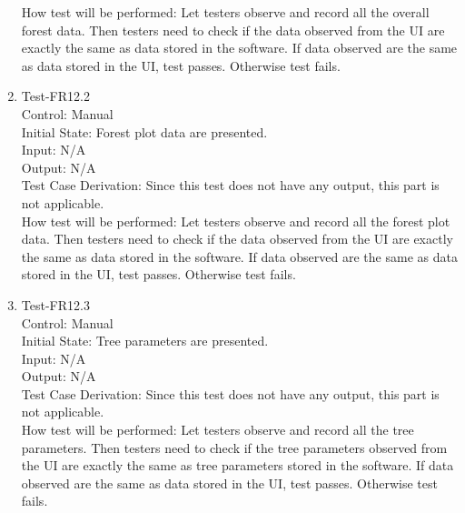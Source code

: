 \documentclass[12pt, titlepage]{article}
\begin{document}
\begin{enumerate}
How test will be performed: Let testers observe and record all the overall 
forest data. Then testers need to check if the data observed from the UI 
are exactly the same as data stored in the software. If data observed are the same
as data stored in the UI, test passes. Otherwise test fails.

\item{Test-FR12.2\\}
Control: Manual\\ 

Initial State: Forest plot data are presented.\\

Input: N/A\\

Output: N/A\\

Test Case Derivation: Since this test does not have any output, this part is
not applicable.\\
					
How test will be performed: Let testers observe and record all the forest plot
data. Then testers need to check if the data observed from the UI 
are exactly the same as data stored in the software. If data observed are the same
as data stored in the UI, test passes. Otherwise test fails.

\item{Test-FR12.3\\}
Control: Manual\\ 

Initial State: Tree parameters are presented.\\

Input: N/A\\

Output: N/A\\

Test Case Derivation: Since this test does not have any output, this part is
not applicable.\\
					
How test will be performed: Let testers observe and record all the tree
parameters. Then testers need to check if the tree parameters observed from the UI 
are exactly the same as tree parameters
stored in the software. If data observed are the same
as data stored in the UI, test passes. Otherwise test fails.
\end{enumerate}
\end{document}
